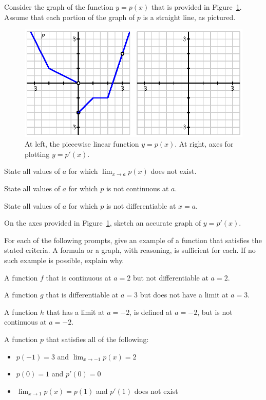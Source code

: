 \begin{exercises} 

\item Consider the graph of the function $y = p(x)$ that is provided in Figure~\ref{F:1.7.Ez2}.  Assume that each portion of the graph of $p$ is a straight line, as pictured.
\begin{figure}[h]
\begin{center}
\includegraphics{figures/1_7_Ez2.eps}
\caption{At left, the piecewise linear function $y = p(x)$.  At right, axes for plotting $y = p'(x)$.} \label{F:1.7.Ez2}
\end{center}
\end{figure}
	\ba
		\item State all values of $a$ for which $\lim_{x \to a} p(x)$ does not exist.
		\item State all values of $a$ for which $p$ is not continuous at $a$.
		\item State all values of $a$ for which $p$ is not differentiable at $x = a$.
		\item On the axes provided in Figure~\ref{F:1.7.Ez2}, sketch an accurate graph of $y = p'(x)$.
	\ea

\item For each of the following prompts, give an example of a function that satisfies the stated criteria.  A formula or a graph, with reasoning, is sufficient for each.  If no such example is possible, explain why.
	\ba
	  \item A function $f$ that is continuous at $a = 2$ but not differentiable at $a = 2$.
	  \item A function $g$ that is differentiable at $a = 3$ but does not have a limit at $a=3$.
	  \item A function $h$ that has a limit at $a = -2$, is defined at $a = -2$, but is not continuous at $a = -2$.
	  \item A function $p$ that satisfies all of the following:
	  \begin{itemize}
	  	\item $p(-1) = 3$ and $\lim_{x \to -1} p(x) = 2$
		\item $p(0) = 1$ and $p'(0) = 0$
		\item $\lim_{x \to 1} p(x) = p(1)$ and $p'(1)$ does not exist
	  \end{itemize}
	\ea


\end{exercises}
